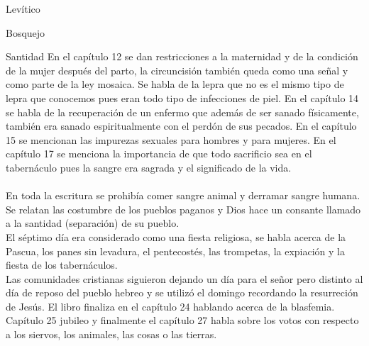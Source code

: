 \begin{section}{Levítico}
\begin{subsection}{Bosquejo}
\begin{subsubsection}{Santidad}
		En el capítulo 12 se dan restricciones a la maternidad y de la condición de la mujer después del parto, la circuncisión también queda como una señal y como parte de la ley mosaica. Se habla de la lepra que no es el mismo tipo de lepra que conocemos pues eran todo tipo de infecciones de piel. En el capítulo 14 se habla de la recuperación de un enfermo que además de ser sanado físicamente, también era sanado espiritualmente con el perdón de sus pecados. En el capítulo 15 se mencionan las impurezas sexuales para hombres y para mujeres. En el capítulo 17 se menciona la importancia de que todo sacrificio sea en el tabernáculo pues la sangre era sagrada y el significado de la vida.\\~\\
		En toda la escritura se prohibía comer sangre animal y derramar sangre humana. Se relatan las costumbre de los pueblos paganos y Dios hace un consante llamado a la santidad (separación) de su pueblo.\\
		El séptimo día era considerado como una fiesta religiosa, se habla acerca de la Pascua, los panes sin levadura, el pentecostés, las trompetas, la expiación y la fiesta de los tabernáculos.\\
		Las comunidades cristianas siguieron dejando un día para el señor pero distinto al día de reposo del pueblo hebreo y se utilizó el domingo recordando la resurreción de Jesús. El libro finaliza en el capítulo 24 hablando acerca de la blasfemia. Capítulo 25 jubileo y finalmente el capítulo 27 habla sobre los votos con respecto a los siervos, los animales, las cosas o las tierras.
	\end{subsubsection}

\end{subsection}
\end{section}
%


